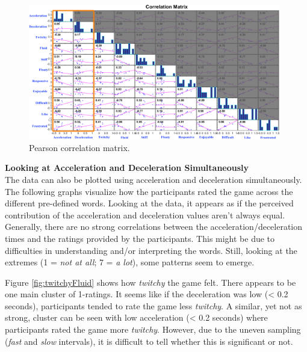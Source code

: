 
\begin{figure}[htbp]
\centering
\includegraphics[width=0.98\textwidth]{Pics/correlationMatrix_final}
\caption{Pearson correlation matrix.}
\label{fig:correlationMatrix}
\end{figure}

\textbf{Looking at Acceleration and Deceleration Simultaneously}\\
The data can also be plotted using acceleration and deceleration simultaneously. The following graphs visualize how the participants rated the game across the different pre-defined words. Looking at the data, it appears as if the perceived contribution of the acceleration and deceleration values aren't always equal. Generally, there are no strong correlations between the acceleration/deceleration times and the ratings provided by the participants. This might be due to difficulties in understanding and/or interpreting the words. Still, looking at the extremes (1 = \textit{not at all}; 7 = \textit{a lot}), some patterns seem to emerge.

Figure \ref{fig:twitchyFluid} shows  how \textit{twitchy} the game felt. There appears to be one main cluster of 1-ratings. It seems like if the deceleration was low (< 0.2 seconds), participants tended to rate the game less \textit{twitchy}. A similar, yet not as strong, cluster can be seen with low acceleration (< 0.2 seconds) where participants rated the game more \textit{twitchy}. However, due to the uneven sampling (\textit{fast} and \textit{slow} intervals), it is difficult to tell whether this is significant or not.

